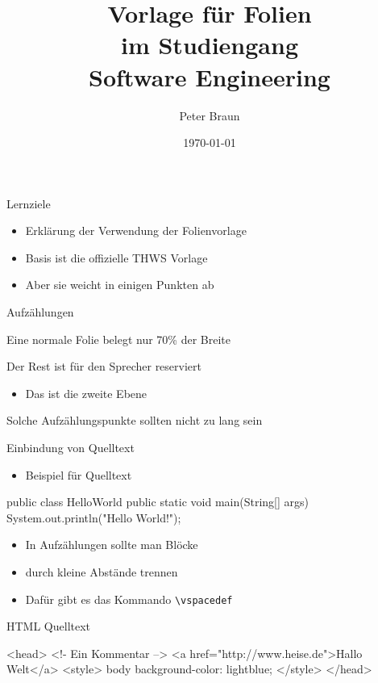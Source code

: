 \documentclass[aspectratio=169]{beamer}
\title{Vorlage für Folien\\ im Studiengang\\Software Engineering}
\author{Peter Braun}
\date{\today}
\begin{document}
\begin{frame}
\titlepage
\end{frame}

\begin{learninggoals}{Lernziele}
\begin{itemize}
  \item Erklärung der Verwendung der Folienvorlage
  \item Basis ist die offizielle THWS Vorlage
  \item Aber sie weicht in einigen Punkten ab
\end{itemize}	
\end{learninggoals}

\begin{itemframe}{Aufzählungen}
    \item Eine normale Folie belegt nur 70\% der Breite
    \item Der Rest ist für den Sprecher reserviert 
    \begin{itemize}
  \item Das ist die zweite Ebene
\end{itemize}

    \item Solche Aufzählungspunkte sollten nicht zu lang sein
\end{itemframe}

\begin{contentsframe}{Einbindung von Quelltext}
\begin{itemize}
  \item Beispiel für Quelltext
\end{itemize}
\begin{java}
public class HelloWorld {
    public static void main(String[] args) {
        System.out.println("Hello World!");
    }
}
\end{java}
\begin{itemize}
  \item In Aufzählungen sollte man Blöcke
  \item durch kleine Abstände trennen
  \item Dafür gibt es das Kommando \texttt{\textbackslash{}vspacedef}
\end{itemize}
\end{contentsframe}

\begin{contentsframe}{HTML Quelltext}
\begin{htmlcssjs}
<head>
  <!- Ein Kommentar -->
  <a href="http://www.heise.de">Hallo Welt</a>
  <style>
    body {
      background-color: lightblue;
    }
  </style>
</head>
\end{htmlcssjs}
\end{contentsframe}
\end{document}
